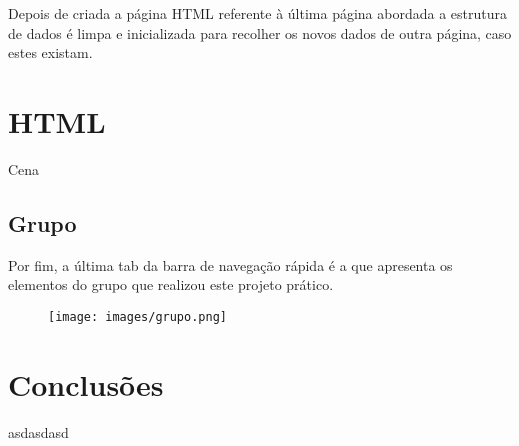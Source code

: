 \documentclass[12pt,letterpaper]{article}
\begin{document}
Depois de criada a página HTML referente à última página abordada a estrutura de dados é limpa e inicializada para recolher os novos dados de outra página, caso estes existam.\\

\newpage
\section{HTML}

\par Cena









\subsection{Grupo}
\par Por fim, a última tab da barra de navegação rápida é a que apresenta os elementos do grupo que realizou este projeto prático.
\par
\begin{figure}[H]
\texttt{[image: images/grupo.png]}
\end{figure}
\newpage

\section{Conclusões}
\par asdasdasd
\end{document}
